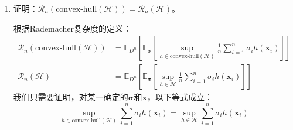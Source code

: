 \documentclass[12pt, a4paper]{article}
\newcommand{\expect}{{\mathbb{E}}}
\newcommand{\HH}{{\mathcal{H}}}
\newcommand{\RR}{{\mathcal{R}}}
\begin{document}
\begin{enumerate}
        应用这一结论，可得：
        \begin{align*}
        &\RR_n(\HH + \HH^\prime) \\
        =& \expect_{D^n} [\expect_{\bm{\sigma}} [\sup_{h_0 \in \HH + \HH^\prime} \frac{1}{n} \sum_{i = 1}^{n} \sigma_i h_0(\bm{x}_i)]] \\
        =& \expect_{D^n} [\expect_{\bm{\sigma}} [\sup_{h \in \HH, h^\prime \in \HH^\prime} \frac{1}{n} \sum_{i = 1}^{n} \sigma_i (h(\bm{x}_i) + h^\prime(\bm{x}_i))]] \\
        =& \expect_{D^n} [\expect_{\bm{\sigma}} [\sup_{h \in \HH} \frac{1}{n} \sum_{i = 1}^{n} \sigma_i h(\bm{x}_i) + \sup_{h^\prime \in \HH^\prime} \frac{1}{n} \sum_{i = 1}^{n} \sigma_i h^\prime(\bm{x}_i)]] \\
        =& \expect_{D^n} [\expect_{\bm{\sigma}} [\sup_{h \in \HH} \frac{1}{n} \sum_{i = 1}^{n} \sigma_i h(\bm{x}_i)]] + \expect_{D^n} [\expect_{\bm{\sigma}} [\sup_{h^\prime \in \HH^\prime} \frac{1}{n} \sum_{i = 1}^{n} \sigma_i h^\prime(\bm{x}_i)]] \\
        =& \RR_n(\HH) + \RR_n(\HH^\prime)
        \end{align*}

        原命题得证。

    \item 证明：$\RR_n(\text{convex-hull}(\HH)) = \RR_n(\HH)$。

        根据Rademacher复杂度的定义：
        \begin{align*}
        \RR_n(\text{convex-hull}(\HH)) &= \expect_{D^n} [\expect_{\bm{\sigma}} [\sup_{h \in \text{convex-hull}(\HH)} \frac{1}{n} \sum_{i = 1}^{n} \sigma_i h(\bm{x}_i)]] \\
        \RR_n(\HH) &= \expect_{D^n} [\expect_{\bm{\sigma}} [\sup_{h \in \HH} \frac{1}{n} \sum_{i = 1}^{n} \sigma_i h(\bm{x}_i)]]
        \end{align*}
        我们只需要证明，对某一确定的$\bm{\sigma}$和$\bm{x}$，以下等式成立：
        \begin{equation}
        \sup_{h \in \text{convex-hull}(\HH)} \sum_{i = 1}^{n} \sigma_i h(\bm{x}_i) = \sup_{h \in \HH} \sum_{i = 1}^{n} \sigma_i h(\bm{x}_i)
        \end{equation}


\end{enumerate}
\end{document}

